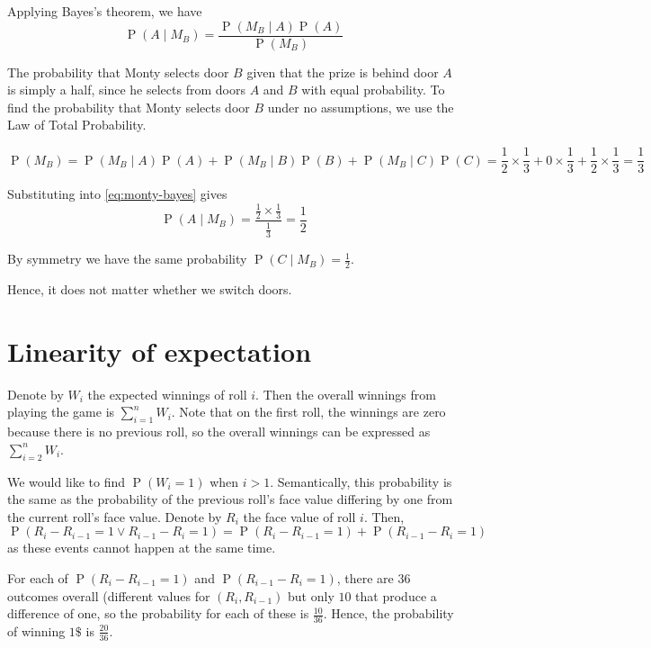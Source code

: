 \documentclass[letterpaper,11pt]{article}
\DeclareMathOperator{\Prob}{P}
\renewcommand{\P}[1]{\Prob{\parens{#1}}}
\newcommand{\parens}[1]{\left(#1\right)}
\newcommand{\given}{\;\vert\;}
\newcommand{\question}{\section}
\begin{document}
Applying Bayes's theorem, we have
\begin{equation}
    \label{eq:monty-bayes}
    \P{A \given M_B} = \frac{
        \P{M_B \given A} \P{A}
    }{
        \P{M_B}
    }
\end{equation}

The probability that Monty selects door $B$ given that the prize is behind door
$A$ is simply a half, since he selects from doors $A$ and $B$ with equal
probability. To find the probability that Monty selects door $B$ under no
assumptions, we use the Law of Total Probability.

\begin{equation*}
    \P{M_B}
    = \P{M_B \given A} \P{A}
    + \P{M_B \given B} \P{B}
    + \P{M_B \given C} \P{C}
    = \frac{1}{2} \times \frac{1}{3}
    + 0 \times \frac{1}{3}
    + \frac{1}{2} \times \frac{1}{3}
    = \frac{1}{3}
\end{equation*}

Substituting into \eqref{eq:monty-bayes} gives
\begin{equation*}
    \P{A \given M_B} = \frac{
        \frac{1}{2} \times \frac{1}{3}
    }{
        \frac{1}{3}
    }
    = \frac{1}{2}
\end{equation*}

By symmetry we have the same probability $\P{C \given M_B} = \frac{1}{2}$.

Hence, it does not matter whether we switch doors.

\question{Linearity of expectation}

Denote by $W_i$ the expected winnings of roll $i$.
Then the overall winnings from playing the game is $\sum_{i=1}^n W_i$.
Note that on the first roll, the winnings are zero because there is no previous
roll, so the overall winnings can be expressed as $\sum_{i=2}^n W_i$.

We would like to find $\P{W_i = 1}$ when $i > 1$.
Semantically, this probability is the same as the probability of the previous
roll's face value differing by one from the current roll's face value.
Denote by $R_i$ the face value of roll $i$. Then,
\begin{equation*}
    \P{R_i - R_{i-1} = 1 \lor R_{i-1} - R_i = 1}
    = \P{R_i - R_{i-1} = 1} + \P{R_{i-1} - R_i = 1}
\end{equation*}
as these events cannot happen at the same time.

For each of $\P{R_i - R_{i-1} = 1}$ and $\P{R_{i-1} - R_i = 1}$, there are $36$
outcomes overall (different values for $(R_i, R_{i-1})$ but only $10$ that
produce a difference of one, so the probability for each of these is
$\frac{10}{36}$.
Hence, the probability of winning $ 1\$ $ is $\frac{20}{36}$.
\end{document}
